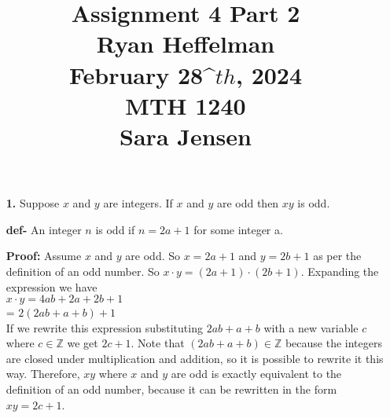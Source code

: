 \documentclass[16pt]{article}
\begin{document}
\large
\date{}
\title{\Large Assignment 4 Part 2 \\ Ryan Heffelman \\ February 28^\(th\), 2024 \\ MTH 1240 \\ Sara Jensen}
\maketitle
\begin{enumerate}
    \item[\textbf{1.}] Suppose $x$ and $y$ are integers. If $x$ and $y$ are odd then $xy$ is odd.
    \item[\textbf{def-}] An integer $n$ is odd if $n = 2a + 1$ for some integer a.
    \item[\textbf{Proof:}] Assume $x$ and $y$ are odd. So $x = 2a + 1$ and $y = 2b + 1$ as per the definition of an odd number. So $x \cdot y = (2a + 1) \cdot (2b + 1)$. Expanding the expression we have \\$x \cdot y = 4ab + 2a + 2b + 1$ \\= $2(2ab + a + b) + 1$ \\  If we rewrite this expression substituting $2ab + a + b$ with a new variable $c$ where $c \in \mathbb{Z}$ we get $2c + 1$. Note that $(2ab + a + b) \in \mathbb{Z}$ because the integers are closed under multiplication and addition, so it is possible to rewrite it this way. Therefore, $xy$ where $x$ and $y$ are odd is exactly equivalent to the definition of an odd number, because it can be rewritten in the form $xy = 2c + 1$. \square
\end{enumerate}
\\ \\
\end{document}
